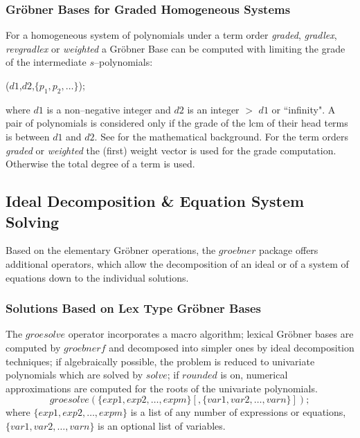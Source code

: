 \subsubsection{Gr\"obner Bases for Graded Homogeneous Systems}

For a homogeneous system of polynomials under a term order
{\it graded}, {\it gradlex}, {\it revgradlex} or {\it weighted}
a Gr\"obner Base can be computed with limiting the grade
of the intermediate $s$--polynomials:
\begin{description}
\item [{\it dd\_groebner}]($d1$,$d2$,$\{p_1,p_2,\ldots\}$);
\end{description}
where $d1$ is a non--negative integer and $d2$ is an integer
$>$ $d1$ or ``infinity". A pair of polynomials is considered
only if the grade of the lcm of their head terms is between
$d1$ and $d2$. See \cite{BeWei:93} for the mathematical background.
For the term orders {\it graded} or {\it weighted} the (first) weight
vector is used for the grade computation. Otherwise the total
degree of a term is used.

\subsection{Ideal Decomposition \& Equation System Solving}
Based on the elementary Gr\"obner operations, the $groebner$ package offers
additional operators, which allow the decomposition of an ideal or of a
system of equations down to the individual solutions.

\subsubsection{Solutions Based on Lex Type Gr\"obner Bases}

 
The $groesolve$ operator incorporates a macro algorithm;
lexical Gr\"obner bases are computed by $groebnerf$ and decomposed
into simpler ones by ideal decomposition techniques; if algebraically
possible, the problem is reduced to univariate polynomials which are
solved by $solve$; if $rounded$ is on, numerical approximations are
computed for the roots of the univariate polynomials.
\[
 groesolve(\{exp1, exp2, \ldots , expm\}[,\{var1, var2, \ldots ,
varn\}]); \]
where $\{exp1, exp2,\ldots , expm\}$ is a list of any number of
expressions or equations, $\{var1, var2, \ldots , varn\}$ is an
optional list of variables.

